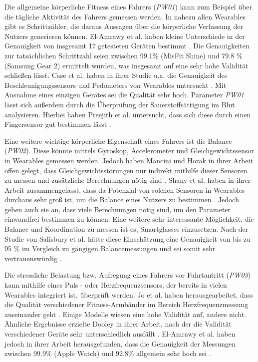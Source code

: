 Die allgemeine körperliche Fitness eines Fahrers (\textit{PW01}) kann zum Beispiel über die tägliche Aktivität des Fahrers gemessen werden. In nahezu allen Wearables gibt es Schrittzähler, die daraus Aussagen über die körperliche Verfassung der Nutzers generieren können.  El-Amrawy et al. haben kleine Unterschiede in der Genauigkeit von insgesamt 17 getesteten Geräten bestimmt \cite{wearabletracking}. Die Genauigkeiten zur tatsächlichen Schrittzahl seien zwischen 99.1\% (MisFit Shine) und 79.8 \%(Samsung Gear 2) ermittelt wurden, was insgesamt auf eine sehr hohe Validität schließen lässt. Case et al. haben in ihrer Studie u.a. die Genauigkeit des Beschleunigungssensors und Pedometers von Wearables untersucht \cite{studyaccuracysmartphoneapplications}. Mit Ausnahme eines einzigen Gerätes sei die Qualität sehr hoch. Parameter \textit{PW01} lässt sich außerdem durch die Überprüfung der Sauerstoffsättigung im Blut analysieren. Hierbei haben Preejith et al. untersucht, dass sich diese durch einen Fingersensor gut bestimmen lässt \cite{spo2oxygen}. 

Eine weitere wichtige körperliche Eigenschaft eines Fahrers ist die Balance (\textit{PW02}). Diese könnte mittels Gyroskop, Accelerometer und Gleichgewichtssensor in Wearables gemessen werden. Jedoch haben Mancini und Horak in ihrer Arbeit offen gelegt, dass Gleichgewichtsstörungen nur indirekt mithilfe dieser Sensoren zu messen und zusätzliche Berechnungen nötig sind \cite{balancewearables}. Shany et al. haben in ihrer Arbeit zusammengefasst, dass da Potenzial von solchen Sensoren in Wearables durchaus sehr groß ist, um die Balance eines Nutzers zu bestimmen \cite{sensorbasedfalls}. Jedoch geben auch sie an, dass viele Berechnungen nötig sind, um den Parameter einwandfrei bestimmen zu können. Eine weitere sehr interessante Möglichkeit, die Balance und Koordination zu messen ist es, Smartglasses einzusetzen. Nach der Studie von Salisbury et al. hätte diese Einschätzung eine Genauigkeit von bis zu 95 \% im Vergleich zu gängigen Balancemessungen und sei somit sehr vertrauenswürdig \cite{smartglasses}.

Die stressliche Belastung bzw. Aufregung eines Fahrers vor Fahrtantritt (\textit{PW03}) kann mithilfe eines Puls - oder Herzfrequenzsensors, der bereits in vielen Wearables integriert ist, überprüft werden. Jo et al. haben herausgearbeitet, dass die Qualität verschiedener Fitness-Armbänder im Bereich Herzfrequenzmessung auseinander geht \cite{biofeedbackwearables}. Einige Modelle wiesen eine hohe Validität auf, andere nicht. Ähnliche Ergebnisse erzielte Dooley in ihrer Arbeit, nach der die Validität verschiedener Geräte sehr unterschiedlich ausfällt \cite{selfmonitoringheartrate}. El-Amrawy et al. haben jedoch in ihrer Arbeit herausgefunden, dass die Genauigkeit der Messungen zwischen 99.9\% (Apple Watch) und 92.8\% allgemein sehr hoch sei \cite{wearabletracking}. 

